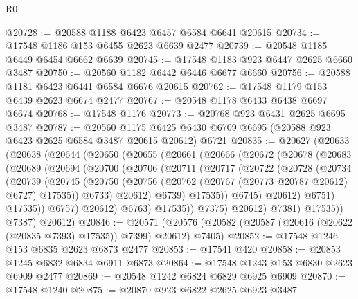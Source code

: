 \begin{lexlean}{R0}
\begin{coremodule}
@20728 := @20588 @1188 @6423 @6457 @6584 @6641 @20615
@20734 := @17548 @1186 @153 @6455 @2623 @6639 @2477
@20739 := @20548 @1185 @6449 @6454 @6662 @6639
@20745 := @17548 @1183 @923 @6447 @2625 @6660 @3487
@20750 := @20560 @1182 @6442 @6446 @6677 @6660
@20756 := @20588 @1181 @6423 @6441 @6584 @6676 @20615
@20762 := @17548 @1179 @153 @6439 @2623 @6674 @2477
@20767 := @20548 @1178 @6433 @6438 @6697 @6674
@20768 := @17548 @1176
@20773 := @20768 @923 @6431 @2625 @6695 @3487
@20787 := @20560
    @1175
    @6425
    @6430
    @6709
    @6695
    (@20588 @923 @6423 @2625 @6584 @3487 @20615 @20612)
    @6721
@20835 := @20627
    (@20633
      (@20638
        (@20644
          (@20650
            (@20655
              (@20661
                (@20666
                  (@20672
                    (@20678
                      (@20683
                        (@20689
                          (@20694
                            (@20700
                              (@20706
                                (@20711
                                  (@20717
                                    (@20722
                                      (@20728
                                        (@20734
                                          (@20739
                                            (@20745
                                              (@20750
                                                (@20756
                                                  (@20762
                                                    (@20767 (@20773 @20787 @20612) @6727)
                                                    @17535))
                                                @6733)
                                              @20612)
                                            @6739)
                                          @17535))
                                      @6745)
                                    @20612)
                                  @6751)
                                @17535))
                            @6757)
                          @20612)
                        @6763)
                      @17535))
                  @7375)
                @20612)
              @7381)
            @17535))
        @7387)
      @20612)
@20846 := @20571
    (@20576 (@20582 (@20587 (@20616 (@20622 (@20835 @7393) @17535)) @7399) @20612) @7405)
@20852 := @17548 @1246 @153 @6835 @2623 @6873 @2477
@20853 := @17541 @420
@20858 := @20853 @1245 @6832 @6834 @6911 @6873
@20864 := @17548 @1243 @153 @6830 @2623 @6909 @2477
@20869 := @20548 @1242 @6824 @6829 @6925 @6909
@20870 := @17548 @1240
@20875 := @20870 @923 @6822 @2625 @6923 @3487

\end{coremodule}
\end{lexlean}
